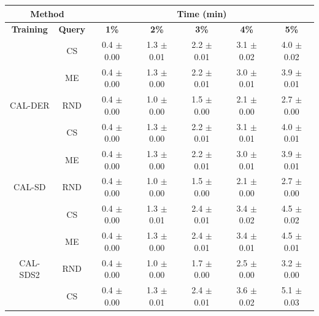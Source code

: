 \begin{table}[htbp]
\centering

\begin{tabular*}{\linewidth}{c|c|@{\extracolsep{\fill}}ccccc}
\toprule
\multicolumn{2}{c|}{\textbf{Method}} & \multicolumn{5}{c}{\textbf{Time (min)}} \\
\midrule
\textbf{Training} & \textbf{Query} & \textbf{1\%} & \textbf{2\%} & \textbf{3\%} & \textbf{4\%} & \textbf{5\%}\\
\midrule
 & CS & 0.4 $\pm$ {\small 0.00} & 1.3 $\pm$ {\small 0.01} & 2.2 $\pm$ {\small 0.01} & 3.1 $\pm$ {\small 0.02} & 4.0 $\pm$ {\small 0.02}\\

 & ME & 0.4 $\pm$ {\small 0.00} & 1.3 $\pm$ {\small 0.00} & 2.2 $\pm$ {\small 0.01} & 3.0 $\pm$ {\small 0.01} & 3.9 $\pm$ {\small 0.01}\\

\multirow{-3}{*}{\raggedright\arraybackslash CAL-DER} & RND & 0.4 $\pm$ {\small 0.00} & 1.0 $\pm$ {\small 0.00} & 1.5 $\pm$ {\small 0.00} & 2.1 $\pm$ {\small 0.00} & 2.7 $\pm$ {\small 0.00}\\
\midrule
 & CS & 0.4 $\pm$ {\small 0.00} & 1.3 $\pm$ {\small 0.00} & 2.2 $\pm$ {\small 0.01} & 3.1 $\pm$ {\small 0.01} & 4.0 $\pm$ {\small 0.01}\\

 & ME & 0.4 $\pm$ {\small 0.00} & 1.3 $\pm$ {\small 0.00} & 2.2 $\pm$ {\small 0.01} & 3.0 $\pm$ {\small 0.01} & 3.9 $\pm$ {\small 0.01}\\

\multirow{-3}{*}{\raggedright\arraybackslash CAL-SD} & RND & 0.4 $\pm$ {\small 0.00} & 1.0 $\pm$ {\small 0.00} & 1.5 $\pm$ {\small 0.00} & 2.1 $\pm$ {\small 0.00} & 2.7 $\pm$ {\small 0.00}\\
\midrule
 & CS & 0.4 $\pm$ {\small 0.00} & 1.3 $\pm$ {\small 0.01} & 2.4 $\pm$ {\small 0.01} & 3.4 $\pm$ {\small 0.02} & 4.5 $\pm$ {\small 0.02}\\

 & ME & 0.4 $\pm$ {\small 0.00} & 1.3 $\pm$ {\small 0.00} & 2.4 $\pm$ {\small 0.01} & 3.4 $\pm$ {\small 0.01} & 4.5 $\pm$ {\small 0.01}\\

\multirow{-3}{*}{\raggedright\arraybackslash CAL-SDS2} & RND & 0.4 $\pm$ {\small 0.00} & 1.0 $\pm$ {\small 0.00} & 1.7 $\pm$ {\small 0.00} & 2.5 $\pm$ {\small 0.00} & 3.2 $\pm$ {\small 0.00}\\
\midrule
 & CS & 0.4 $\pm$ {\small 0.00} & 1.3 $\pm$ {\small 0.01} & 2.4 $\pm$ {\small 0.01} & 3.6 $\pm$ {\small 0.02} & 5.1 $\pm$ {\small 0.03}\\


\end{tabular*}
\end{table}
